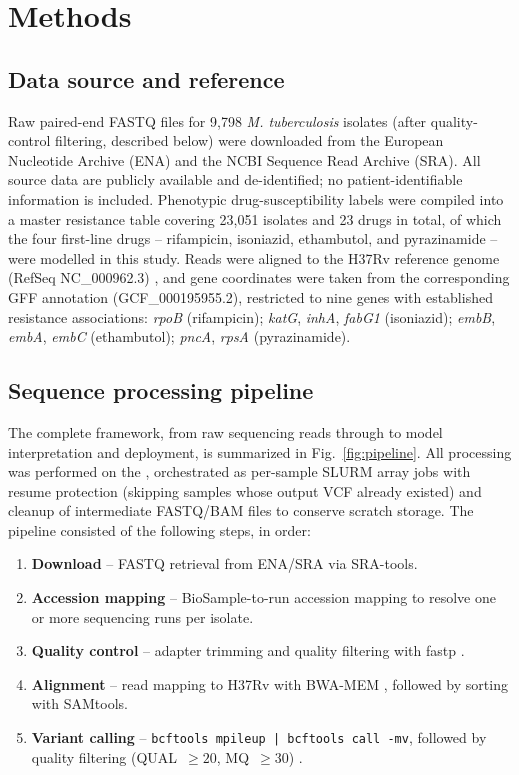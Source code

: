 \section{Methods}

\subsection{Data source and reference}

Raw paired-end FASTQ files for 9{,}798 \emph{M. tuberculosis} isolates (after quality-control filtering, described below) were downloaded from the European Nucleotide Archive (ENA) and the NCBI Sequence Read Archive (SRA). All source data are publicly available and de-identified; no patient-identifiable information is included. Phenotypic drug-susceptibility labels were compiled into a master resistance table covering 23{,}051 isolates and 23 drugs in total, of which the four first-line drugs -- rifampicin, isoniazid, ethambutol, and pyrazinamide -- were modelled in this study. Reads were aligned to the H37Rv reference genome (RefSeq NC\_000962.3) \cite{cole1998deciphering}, and gene coordinates were taken from the corresponding GFF annotation (GCF\_000195955.2), restricted to nine genes with established resistance associations: \emph{rpoB} (rifampicin); \emph{katG}, \emph{inhA}, \emph{fabG1} (isoniazid); \emph{embB}, \emph{embA}, \emph{embC} (ethambutol); \emph{pncA}, \emph{rpsA} (pyrazinamide).

\subsection{Sequence processing pipeline}

The complete framework, from raw sequencing reads through to model interpretation and deployment, is summarized in Fig.~\ref{fig:pipeline}. All processing was performed on the , orchestrated as per-sample SLURM array jobs with resume protection (skipping samples whose output VCF already existed) and cleanup of intermediate FASTQ/BAM files to conserve scratch storage. The pipeline consisted of the following steps, in order:

\begin{enumerate}
\item \textbf{Download} -- FASTQ retrieval from ENA/SRA via SRA-tools.
\item \textbf{Accession mapping} -- BioSample-to-run accession mapping to resolve one or more sequencing runs per isolate.
\item \textbf{Quality control} -- adapter trimming and quality filtering with fastp \cite{chen2018fastp}.
\item \textbf{Alignment} -- read mapping to H37Rv with BWA-MEM \cite{li2013bwamem}, followed by sorting with SAMtools.
\item \textbf{Variant calling} -- \texttt{bcftools mpileup | bcftools call -mv}, followed by quality filtering (QUAL~$\geq 20$, MQ~$\geq 30$) \cite{danecek2021twelve}.
\end{enumerate}

